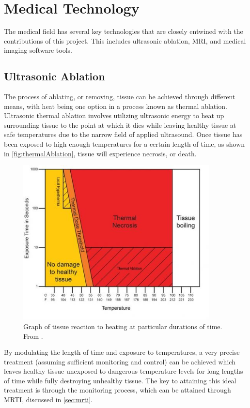 \documentclass[12pt]{report}
\begin{document}
\section{Medical Technology}
The medical field has several key technologies that are closely entwined with the contributions of this project. This includes ultrasonic ablation, MRI, and medical imaging software tools.

\subsection{Ultrasonic Ablation}
\label{sec:ultrasonicAblation}
The process of ablating, or removing, tissue can be achieved through different means, with heat being one option in a process known as thermal ablation. \cite{thermalAblation} Ultrasonic thermal ablation involves utilizing ultrasonic energy to heat up surrounding tissue to the point at which it dies while leaving healthy tissue at safe temperatures due to the narrow field of applied ultrasound. \cite{thermalAblation} Once tissue has been exposed to high enough temperatures for a certain length of time, as shown in \autoref{fig:thermalAblation}, tissue will experience necrosis, or death. \cite{thermalAblationFocusedUltrasound}

\begin{figure}[thpb]
	\centering
	\includegraphics[width=4in]{images/Thermal_Ablation.jpg}
    \caption{Graph of tissue reaction to heating at particular durations of time. From \cite{thermalAblationFocusedUltrasound}.}
    \label{fig:thermalAblation}
\end{figure}

By modulating the length of time and exposure to temperatures, a very precise treatment (assuming sufficient monitoring and control) can be achieved which leaves healthy tissue unexposed to dangerous temperature levels for long lengths of time while fully destroying unhealthy tissue. The key to attaining this ideal treatment is through the monitoring process, which can be attained through MRTI, discussed in \autoref{sec:mrti}.
\end{document}
